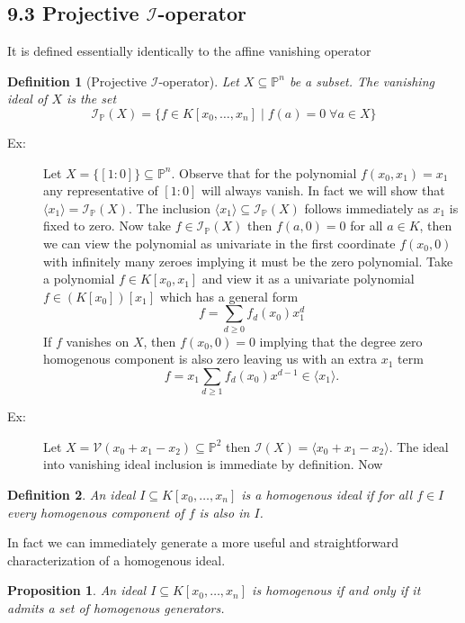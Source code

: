 \documentclass[40pt]{article}
\newtheorem{definition}{Definition}[section]
\newcommand{\mcal}[1]{\mathcal{#1}}
\newcommand{\Proj}{\mathbb{P}}
\newcommand{\I}{\mathcal{I}}
\newcommand{\V}{\mathcal{V}}
\newcommand{\la}{\langle}
\newcommand{\ra}{\rangle}
\newtheorem{proposition}{Proposition}[section]
\theoremstyle{remark}
\begin{document}
\subsection{9.3 Projective $\mathcal{I}$-operator}
It is defined essentially identically to the affine vanishing operator
\begin{definition}[Projective $\mcal{I}$-operator]
	Let $ X \subseteq \Proj^n$ be a subset. The vanishing ideal of $X$ is the set
	\[
	\mcal{I}_\Proj(X) = \{f \in K[x_0,\dots,x_n] \; | \; f(a) = 0 \; \forall a \in X\}
	\]
\end{definition}
\begin{description}
	\item[Ex:] Let $X = \{[1:0]\} \subseteq \Proj^n$.  Observe that for the polynomial $f(x_0,x_1) = x_1$ any representative of $[1:0]$ will always vanish. In fact we will show that $\la x_1 \ra = \I_\Proj(X)$. The inclusion $\la x_1 \ra \subseteq \I_\Proj(X)$ follows immediately as $x_1$ is fixed to zero. Now take $f \in \I_\Proj(X)$ then $f(a, 0) = 0$ for all $a \in K$, then we can view the polynomial as univariate in the first coordinate $f(x_0, 0)$ with infinitely many zeroes implying it must be the zero polynomial. Take a polynomial $f \in K[x_0,x_1]$ and view it as a univariate polynomial $f \in (K[x_0])[x_1]$ which has a general form 
	\[
	f = \sum_{d \geq 0} f_d(x_0)x_1^d
	\]
	If $f$ vanishes on $X$, then $f(x_0, 0) = 0$ implying that the degree zero homogenous component is also zero leaving us with an extra $x_1$ term
	\[
	f = x_1\sum_{d\geq 1}f_d(x_0)x^{d-1} \in \la x_1 \ra.
	\]
	\item[Ex:] Let $X = \V(x_0 + x_1 - x_2) \subseteq \Proj^2$ then $\I(X) = \la x_0 + x_1 - x_2 \ra$. The ideal into vanishing ideal inclusion is immediate by definition. Now
\end{description}
\begin{definition}
	An ideal $I \subseteq K[x_0,\dots,x_n]$ is a homogenous ideal if for all $f \in I$ every homogenous component of $f$ is also in $I$.
\end{definition}
In fact we can immediately generate a more useful and straightforward characterization of a homogenous ideal. 
\begin{proposition}
	An ideal $I \subseteq K[x_0,\dots,x_n]$ is homogenous if and only if it admits a set of homogenous generators. 
\end{proposition}
\end{document}
